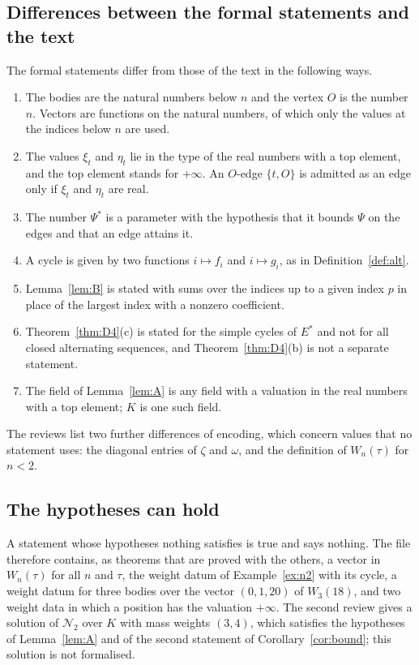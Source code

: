 \documentclass[11pt]{amsart}
\theoremstyle{definition}
\theoremstyle{remark}
\numberwithin{equation}{section}
\newcommand{\repo}[1]{\texttt{\detokenize{#1}}}
\newcommand{\cN}{\mathcal{N}}
\newcommand{\Ps}{\Psi^{*}}
\newcommand{\Es}{E^{*}}
\begin{document}
\subsection*{Differences between the formal statements and the text} The formal statements differ from
those of the text in the following ways.
\begin{enumerate}
\item The bodies are the natural numbers below $n$ and the vertex $O$ is the number $n$. Vectors are
functions on the natural numbers, of which only the values at the indices below $n$ are used.
\item The values $\xi_t$ and $\eta_t$ lie in the type of the real numbers with a top element, and the
top element stands for $+\infty$. An $O$-edge $\{t, O\}$ is admitted as an edge only if $\xi_t$ and
$\eta_t$ are real.
\item The number $\Ps$ is a parameter with the hypothesis that it bounds $\Psi$ on the edges and that
an edge attains it.
\item A cycle is given by two functions $i \mapsto f_i$ and $i \mapsto g_i$, as in
Definition~\ref{def:alt}.
\item Lemma~\ref{lem:B} is stated with sums over the indices up to a given index $p$ in place of the
largest index with a nonzero coefficient.
\item Theorem~\ref{thm:D4}(c) is stated for the simple cycles of $\Es$ and not for all closed
alternating sequences, and Theorem~\ref{thm:D4}(b) is not a separate statement.
\item The field of Lemma~\ref{lem:A} is any field with a valuation in the real numbers with a top
element; $K$ is one such field.
\end{enumerate}
The reviews list two further differences of encoding, which concern values that no statement uses:
the diagonal entries of $\zeta$ and $\omega$, and the definition of $W_n(\tau)$ for $n < 2$.

\subsection*{The hypotheses can hold} A statement whose hypotheses nothing satisfies is true and says
nothing. The file \repo{Challenge.lean} therefore contains, as theorems that are proved with the
others, a vector in $W_n(\tau)$ for all $n$ and $\tau$, the weight datum of Example~\ref{ex:n2} with its
cycle, a weight datum for three bodies over the vector $(0, 1, 20)$ of $W_3(18)$, and two weight data in
which a position has the valuation $+\infty$. The second review gives a solution of $\cN_2$ over $K$
with mass weights $(3, 4)$, which satisfies the hypotheses of Lemma~\ref{lem:A} and of the second
statement of Corollary~\ref{cor:bound}; this solution is not formalised.
\end{document}
